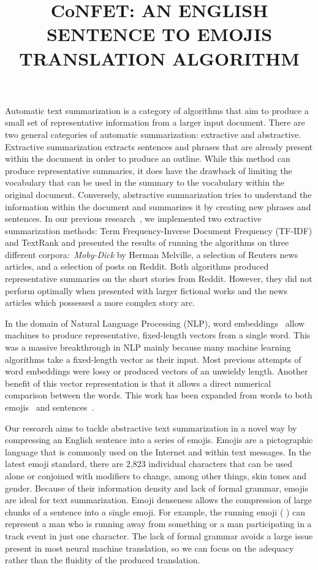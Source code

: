 \documentclass{article}[10]
\newcommand*{\img}[1]{%
  \raisebox{-.3\baselineskip}{%
    \texttt{[image: \#1]}%
  }%
} \title{{CoNFET:} AN ENGLISH SENTENCE TO EMOJIS TRANSLATION ALGORITHM}
\begin{document}
Automatic text summarization is a category of algorithms that aim to produce a
small set of representative information from a larger input document. There are
two general categories of automatic summarization: extractive and abstractive.
Extractive summarization extracts sentences and phrases that are already
present within the document in order to produce an outline. While this method
can produce representative summaries, it does have the drawback of limiting the
vocabulary that can be used in the summary to the vocabulary within the original
document. Conversely, abstractive summarization tries to understand the
information within the document and summarizes it by creating new phrases and
sentences. In our previous research~\cite{day_extractive}, we implemented two
extractive summarization methods: Term Frequency-Inverse Document Frequency
(TF-IDF) and TextRank and presented the results of running the algorithms on
three different corpora:~\emph{Moby-Dick} by Herman Melville, a selection of
Reuters news articles, and a selection of posts on Reddit. Both algorithms
produced representative summaries on the short stories from Reddit. However,
they did not perform optimally when presented with larger fictional works and the news articles which possessed
a more complex story arc.

In the domain of Natural Language Processing (NLP), word
embeddings~\cite{mikolov2013efficient} allow machines to produce representative,
fixed-length vectors from a single word. This was a massive breakthrough in NLP
mainly because many machine learning algorithms take a fixed-length vector as
their input. Most previous attempts of word embeddings were lossy or produced
vectors of an unwieldy length. Another benefit of this vector representation is
that it allows a direct numerical comparison between the words. This work has
been expanded from words to both emojis~\cite{Eisner_2016} and
sentences~\cite{pg2017unsu}.

Our research aims to tackle abstractive text summarization in a novel way by
compressing an English sentence into a series of emojis. Emojis are a
pictographic language that is commonly used on the Internet and within text
messages. In the latest emoji standard, there are 2,823 individual characters
that can be used alone or conjoined with modifiers to change, among other
things, skin tones and gender. Because of their information density and lack of
formal grammar, emojis are ideal for text summarization. Emoji denseness allows
the compression of large chunks of a sentence into a single emoji. For example,
the running emoji (\img{emojis/1f3c3.png}) can represent a man who is running
away from something or a man participating in a track event in just one
character. The lack of formal grammar avoids a large issue present in most
neural machine translation, so we can focus on the adequacy rather than the
fluidity of the produced translation.
\end{document}
